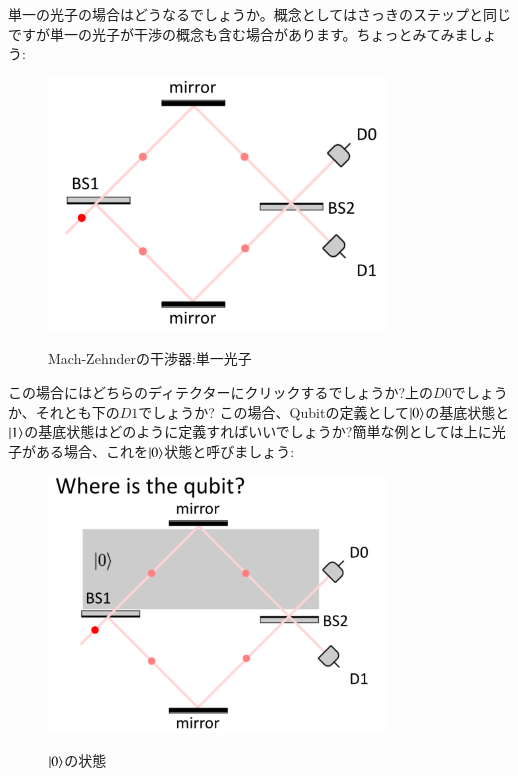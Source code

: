単一の光子の場合はどうなるでしょうか。概念としてはさっきのステップと同じですが単一の光子が干渉の概念も含む場合があります。ちょっとみてみましょう:
\begin{figure}[H]
   \centering
    \includegraphics[width=0.8\textwidth]{lesson6/mach_zehnder_single_photon.pdf}
    \label{fig: 1}
    \begin{center}
        \caption{Mach-Zehnderの干渉器:単一光子}
    \end{center}
\end{figure}

この場合にはどちらのディテクターにクリックするでしょうか?上の$D0$でしょうか、それとも下の$D1$でしょうか?
この場合、Qubitの定義として$\ket{0}$の基底状態と$\ket{1}$の基底状態はどのように定義すればいいでしょうか?簡単な例としては上に光子がある場合、これを$\ket{0}$状態と呼びましょう:
\begin{figure}[H]
   \centering
    \includegraphics[width=0.8\textwidth]{lesson6/0_ket_botttom.pdf}
    \label{fig: 1}
    \begin{center}
        \caption{$\ket{0}$の状態}
    \end{center}
\end{figure}

